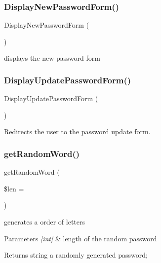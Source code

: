 \subsubsection{\texorpdfstring{Display\+New\+Password\+Form()}{DisplayNewPasswordForm()}}
{\footnotesize\ttfamily Display\+New\+Password\+Form (\begin{DoxyParamCaption}{ }\end{DoxyParamCaption})}



displays the new password form 

\mbox{\label{class_user_controller_a02d05cea0778c17290eeb6291dc43af8}} 
\subsubsection{\texorpdfstring{Display\+Update\+Password\+Form()}{DisplayUpdatePasswordForm()}}
{\footnotesize\ttfamily Display\+Update\+Password\+Form (\begin{DoxyParamCaption}{ }\end{DoxyParamCaption})}



Redirects the user to the password update form. 

\mbox{\label{class_user_controller_ac8ab29f78e095ed4fda232d64056005e}} 
\subsubsection{\texorpdfstring{get\+Random\+Word()}{getRandomWord()}}
{\footnotesize\ttfamily get\+Random\+Word (\begin{DoxyParamCaption}\item[{}]{\$len = {} }\end{DoxyParamCaption})}



generates a order of letters 


\begin{DoxyParams}{Parameters}
{\em \mbox{[}int\mbox{]}} & length of the random password\\
\hline
\end{DoxyParams}
\begin{DoxyReturn}{Returns}
string a randomly generated password; 
\end{DoxyReturn}
\mbox{\label{class_user_controller_ad14a0bb9938aa18999d1e9b655bb28b1}} 
